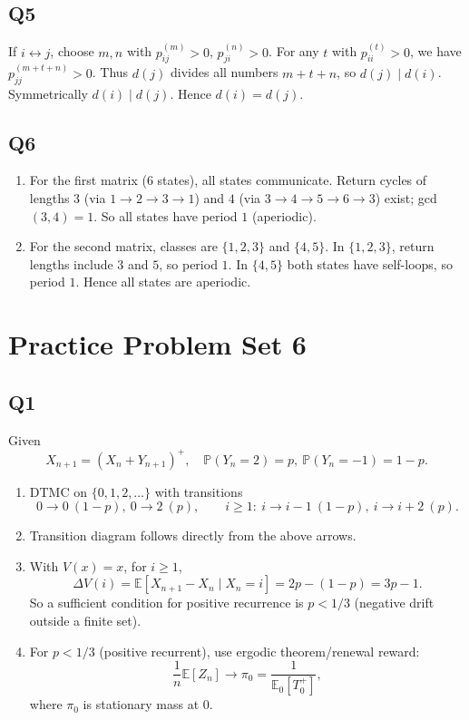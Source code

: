\documentclass[11pt]{article}
\newcommand{\PP}{\mathbb{P}}
\newcommand{\EE}{\mathbb{E}}
\newcommand{\1}{\mathbf{1}}
\begin{document}
\subsection*{Q5}
If $i\leftrightarrow j$, choose $m,n$ with $p^{(m)}_{ij}>0$, $p^{(n)}_{ji}>0$. For any $t$ with $p^{(t)}_{ii}>0$, we have $p^{(m+t+n)}_{jj}>0$. Thus $d(j)$ divides all numbers $m+t+n$, so $d(j)\mid d(i)$. Symmetrically $d(i)\mid d(j)$. Hence $d(i)=d(j)$.

\subsection*{Q6}
\begin{enumerate}[label=(\alph*)]
\item For the first matrix (6 states), all states communicate. Return cycles of lengths $3$ (via $1\to2\to3\to1$) and $4$ (via $3\to4\to5\to6\to3$) exist; gcd$(3,4)=1$. So all states have period $1$ (aperiodic).
\item For the second matrix, classes are $\{1,2,3\}$ and $\{4,5\}$. In $\{1,2,3\}$, return lengths include $3$ and $5$, so period $1$. In $\{4,5\}$ both states have self-loops, so period $1$. Hence all states are aperiodic.
\end{enumerate}

\section{Practice Problem Set 6}

\subsection*{Q1}
Given
\[
X_{n+1}=(X_n+Y_{n+1})^+,
\quad \PP(Y_{n}=2)=p,\ \PP(Y_n=-1)=1-p.
\]
\begin{enumerate}[label=(\alph*)]
\item DTMC on $\{0,1,2,\dots\}$ with transitions
\[
0\to 0\ (1-p),\ 0\to2\ (p),\qquad i\ge1:\ i\to i-1\ (1-p),\ i\to i+2\ (p).
\]
\item Transition diagram follows directly from the above arrows.
\item With $V(x)=x$, for $i\ge1$,
\[
\Delta V(i)=\EE[X_{n+1}-X_n\mid X_n=i]=2p-(1-p)=3p-1.
\]
So a sufficient condition for positive recurrence is $p<1/3$ (negative drift outside a finite set).
\item For $p<1/3$ (positive recurrent), use ergodic theorem/renewal reward:
\[
\frac1n\EE[Z_n]\to \pi_0=\frac1{\EE_0[T_0^+]},
\]
where $\pi_0$ is stationary mass at $0$.
\end{enumerate}
\end{document}
